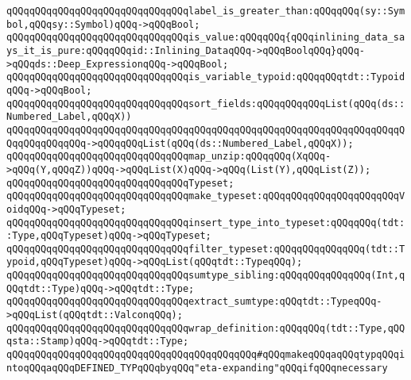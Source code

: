 \verb|qQQqqQQqqQQqqQQqqQQqqQQqqQQqqQQqlabel_is_greater_than:qQQqqQQq(sy::Symbol,qQQqsy::Symbol)qQQq->qQQqBool;|\newline
\newline
\verb|qQQqqQQqqQQqqQQqqQQqqQQqqQQqqQQqis_value:qQQqqQQq{qQQqinlining_data_says_it_is_pure:qQQqqQQqid::Inlining_DataqQQq->qQQqBoolqQQq}qQQq->qQQqds::Deep_ExpressionqQQq->qQQqBool;|\newline
\verb|qQQqqQQqqQQqqQQqqQQqqQQqqQQqqQQqis_variable_typoid:qQQqqQQqtdt::TypoidqQQq->qQQqBool;|\newline
\newline
\verb|qQQqqQQqqQQqqQQqqQQqqQQqqQQqqQQqsort_fields:qQQqqQQqqQQqList(qQQq(ds::Numbered_Label,qQQqX))|\newline
\verb|qQQqqQQqqQQqqQQqqQQqqQQqqQQqqQQqqQQqqQQqqQQqqQQqqQQqqQQqqQQqqQQqqQQqqQQqqQQqqQQqqQQq->qQQqqQQqList(qQQq(ds::Numbered_Label,qQQqX));|\newline
\newline
\verb|qQQqqQQqqQQqqQQqqQQqqQQqqQQqqQQqmap_unzip:qQQqqQQq(XqQQq->qQQq(Y,qQQqZ))qQQq->qQQqList(X)qQQq->qQQq(List(Y),qQQqList(Z));|\newline
\newline
\verb|qQQqqQQqqQQqqQQqqQQqqQQqqQQqqQQqTypeset;|\newline
\newline
\verb|qQQqqQQqqQQqqQQqqQQqqQQqqQQqqQQqmake_typeset:qQQqqQQqqQQqqQQqqQQqqQQqVoidqQQq->qQQqTypeset;|\newline
\verb|qQQqqQQqqQQqqQQqqQQqqQQqqQQqqQQqinsert_type_into_typeset:qQQqqQQq(tdt::Type,qQQqTypeset)qQQq->qQQqTypeset;|\newline
\verb|qQQqqQQqqQQqqQQqqQQqqQQqqQQqqQQqfilter_typeset:qQQqqQQqqQQqqQQq(tdt::Typoid,qQQqTypeset)qQQq->qQQqList(qQQqtdt::TypeqQQq);|\newline
\newline
\verb|qQQqqQQqqQQqqQQqqQQqqQQqqQQqqQQqsumtype_sibling:qQQqqQQqqQQqqQQq(Int,qQQqtdt::Type)qQQq->qQQqtdt::Type;|\newline
\verb|qQQqqQQqqQQqqQQqqQQqqQQqqQQqqQQqextract_sumtype:qQQqtdt::TypeqQQq->qQQqList(qQQqtdt::ValconqQQq);|\newline
\newline
\verb|qQQqqQQqqQQqqQQqqQQqqQQqqQQqqQQqwrap_definition:qQQqqQQq(tdt::Type,qQQqsta::Stamp)qQQq->qQQqtdt::Type;|\newline
\newline
\verb|qQQqqQQqqQQqqQQqqQQqqQQqqQQqqQQqqQQqqQQqqQQq#qQQqmakeqQQqaqQQqtypqQQqintoqQQqaqQQqDEFINED_TYPqQQqbyqQQq"eta-expanding"qQQqifqQQqnecessary|\newline
